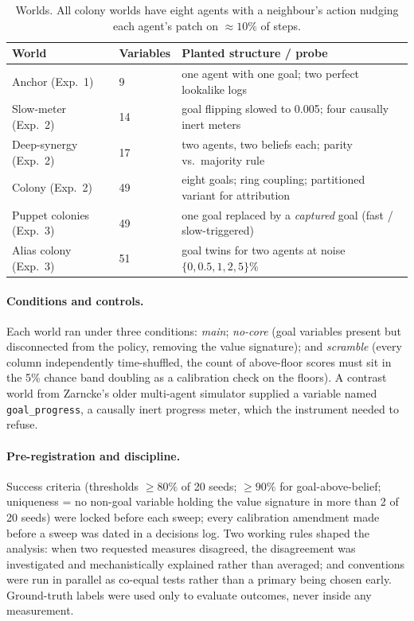 \documentclass[11pt]{article}
\newcommand{\pkg}[1]{\texttt{#1}}
\begin{document}
\begin{table}[t]
\centering\small
\caption{Worlds. All colony worlds have eight agents with a neighbour's action
nudging each agent's patch on $\approx 10\%$ of steps.}
\label{tab:worlds}
\begin{tabular}{@{}lll@{}}
\toprule
World & Variables & Planted structure / probe \\
\midrule
Anchor (Exp.~1) & 9 & one agent with one goal; two perfect lookalike logs \\
Slow-meter (Exp.~2) & 14 & goal flipping slowed to 0.005; four causally inert meters \\
Deep-synergy (Exp.~2) & 17 & two agents, two beliefs each; parity vs.\ majority rule \\
Colony (Exp.~2) & 49 & eight goals; ring coupling; partitioned variant for attribution \\
Puppet colonies (Exp.~3) & 49 & one goal replaced by a \emph{captured} goal (fast / slow-triggered) \\
Alias colony (Exp.~3) & 51 & goal twins for two agents at noise $\{0,0.5,1,2,5\}\%$ \\
\bottomrule
\end{tabular}
\end{table}

\paragraph{Conditions and controls.}
Each world ran under three conditions: \emph{main}; \emph{no-core} (goal variables
present but disconnected from the policy, removing the value signature); and
\emph{scramble} (every column independently time-shuffled, the count of above-floor
scores must sit in the 5\% chance band doubling as a calibration check on the floors).
A contrast world from Zarncke's older multi-agent simulator supplied a variable named
\pkg{goal\_progress}, a causally inert progress meter, which the instrument needed to
refuse.

\paragraph{Pre-registration and discipline.}
Success criteria (thresholds $\geq 80\%$ of 20 seeds; $\geq 90\%$ for goal-above-belief;
uniqueness = no non-goal variable holding the value signature in more than 2 of 20 seeds) were
locked before each sweep; every calibration amendment made before a sweep was dated in a
decisions log. Two working rules shaped the analysis: when two requested measures
disagreed, the disagreement was investigated and mechanistically explained rather than
averaged; and conventions were run in parallel as co-equal tests rather than a primary
being chosen early. Ground-truth labels were used only to evaluate outcomes, never inside
any measurement.
\end{document}
